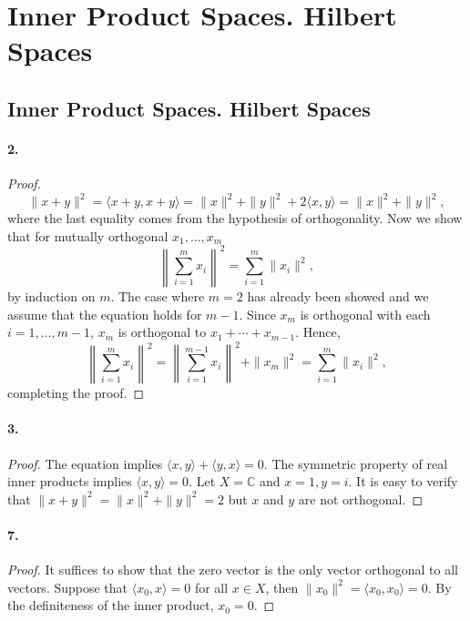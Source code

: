 \section{Inner Product Spaces. Hilbert Spaces}
\subsection{Inner Product Spaces. Hilbert Spaces}
  \paragraph{2.}
  \begin{proof}
    \[
      \|x+y\|^2 = \langle x+y, x+y\rangle = \|x\|^2+\|y\|^2+2\langle x, y\rangle
      =\|x\|^2+\|y\|^2,
    \]
    where the last equality comes from the hypothesis of orthogonality. Now we
    show that for mutually orthogonal $x_1,\dots,x_m$ 
    \[
      \left\|\sum_{i=1}^m x_i\right\|^2 = \sum_{i=1}^m\|x_i\|^2,
    \]
    by induction on $m$. The case where $m=2$ has already been showed and we
    assume that the equation holds for $m-1$. Since $x_m$ is orthogonal with
    each $i=1,\dots,m-1$, $x_m$ is orthogonal to $x_1+\cdots+x_{m-1}$. Hence,
    \[
      \left\|\sum_{i=1}^m x_i\right\|^2 = 
      \left\|\sum_{i=1}^{m-1}x_i\right\|^2 + \|x_m\|^2 = 
      \sum_{i=1}^m\|x_i\|^2,
    \]
    completing the proof.
  \end{proof}
  
  \paragraph{3.}
  \begin{proof}
    The equation implies $\langle x, y\rangle+\langle y, x\rangle=0$. The
    symmetric property of real inner products implies $\langle x, y\rangle=0$.
    Let $X=\mathbb{C}$ and $x=1, y=i$. It is easy to verify that $\|x+y\|^2=
    \|x\|^2+\|y\|^2=2$ but $x$ and $y$ are not orthogonal.
  \end{proof}
  
  \paragraph{7.}
  \begin{proof}
    It suffices to show that the zero vector is the only vector orthogonal to
    all vectors. Suppose that $\langle x_0, x\rangle=0$ for all $x\in X$, then
    $\|x_0\|^2=\langle x_0, x_0\rangle=0$. By the definiteness of the inner
    product, $x_0=0$.
  \end{proof}
  
